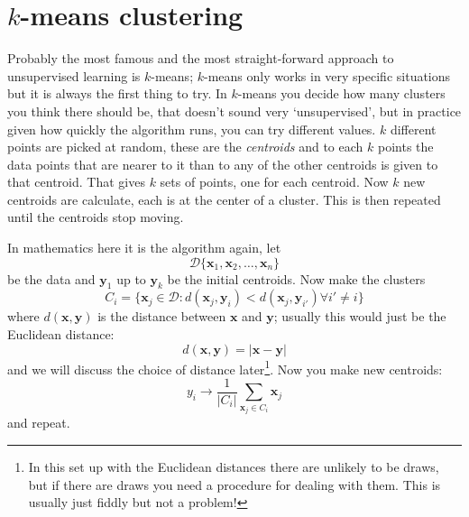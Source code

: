 \documentclass[12pt]{article}
\begin{document}
\section*{$k$-means clustering}

Probably the most famous and the most straight-forward approach to
unsupervised learning is $k$-means; $k$-means only works in very
specific situations but it is always the first thing to try. In
$k$-means you decide how many clusters you think there should be, that
doesn't sound very `unsupervised', but in practice given how quickly
the algorithm runs, you can try different values. $k$ different points
are picked at random, these are the \textsl{centroids} and to each $k$
points the data points that are nearer to it than to any of the other
centroids is given to that centroid. That gives $k$ sets of points, one
for each centroid. Now $k$ new centroids are calculate, each is at the
center of a cluster. This is then repeated until the centroids stop moving.

In mathematics here it is the algorithm again, let
\begin{equation}
  \mathcal{D}\{\mathbf{x}_1,\mathbf{x}_2,\ldots,\mathbf{x}_n\}
\end{equation}
be the data and $\mathbf{y}_1$ up to $\mathbf{y}_k$ be the initial centroids. Now make the clusters
\begin{equation}
  C_i=\{\mathbf{x}_j\in\mathcal{D}:d(\mathbf{x}_j,\mathbf{y}_i)<d(\mathbf{x}_j,\mathbf{y}_{i'})\forall i'\not=i\}
\end{equation}
where $d(\mathbf{x},\mathbf{y})$ is the distance between $\mathbf{x}$ and $\mathbf{y}$; usually this would just be the Euclidean distance:
\begin{equation}
  d(\mathbf{x},\mathbf{y})=|\mathbf{x}-\mathbf{y}|
\end{equation}
and we will discuss the choice of distance later\footnote{In this set
up with the Euclidean distances there are unlikely to be draws, but if
there are draws you need a procedure for dealing with them. This is
usually just fiddly but not a problem!}. Now you make new centroids:
\begin{equation}
  y_i\rightarrow \frac{1}{|C_i|}\sum_{\mathbf{x}_j\in C_i}\mathbf{x}_j
\end{equation}
and repeat.
\end{document}
